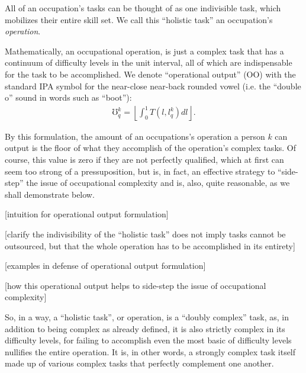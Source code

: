 \documentclass[hidelinks, nonatbib]{elsarticle}
\begin{document}
\begin{axiom}
    \label{woca}
    All of an occupation's tasks can be thought of as one indivisible task, which mobilizes their entire skill set. We call this ``holistic task'' an occupation's \textit{operation}.

    Mathematically, an occupational operation, is just a complex task that has a continuum of difficulty levels in the unit interval, all of which are indispensable for the task to be accomplished. We denote ``operational output'' (OO) with the standard IPA symbol for the near-close near-back rounded vowel (i.e. the ``double o'' sound in words such as ``boot''):
    \begin{gather}
        \mho_{q}^{k} = 
        \left\lfloor
            \int_{0}^{1}{
                T(l,l_{q}^{k})
                dl
            }
        \right\rfloor
        .
    \end{gather}

    By this formulation, the amount of an occupations's operation a person $k$ can output is the floor of what they accomplish of the operation's complex tasks. Of course, this value is zero if they are not perfectly qualified, which at first can seem too strong of a pressuposition, but is, in fact, an effective strategy to ``side-step'' the issue of occupational complexity and is, also, quite reasonable, as we shall demonstrate below.

    [intuition for operational output formulation]
    
    [clarify the indivisibility of the ``holistic task'' does not imply tasks cannot be outsourced, but that the whole operation has to be accomplished in its entirety]

    [examples in defense of operational output formulation]
    
    [how this operational output helps to side-step the issue of occupational complexity]

    So, in a way, a ``holistic task'', or operation, is a ``doubly complex'' task, as, in addition to being complex as already defined, it is also strictly complex in its difficulty levels, for failing to accomplish even the most basic of difficulty levels nullifies the entire operation. It is, in other words, a strongly complex task itself made up of various complex tasks that perfectly complement one another.


\end{axiom}
\end{document}
